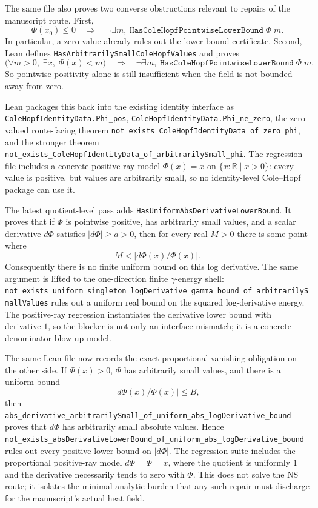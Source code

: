 \documentclass[11pt]{article}
\theoremstyle{remark}
\begin{document}
The same file also proves two converse obstructions relevant to repairs of the
manuscript route.  First,
\[
  \Phi(x_0) \le 0
  \quad\Longrightarrow\quad
  \neg \exists m,\; \texttt{HasColeHopfPointwiseLowerBound}\;\Phi\;m.
\]
In particular, a zero value already rules out the lower-bound certificate.
Second, Lean defines \texttt{HasArbitrarilySmallColeHopfValues} and proves
\[
  \bigl(\forall m>0,\; \exists x,\; \Phi(x)<m\bigr)
  \quad\Longrightarrow\quad
  \neg \exists m,\; \texttt{HasColeHopfPointwiseLowerBound}\;\Phi\;m.
\]
So pointwise positivity alone is still insufficient when the field is not
bounded away from zero.

Lean packages this back into the existing identity interface as
\texttt{ColeHopfIdentityData.Phi\_pos},
\texttt{ColeHopfIdentityData.Phi\_ne\_zero}, the zero-valued route-facing
theorem \texttt{not\_exists\_ColeHopfIdentityData\_of\_zero\_phi}, and the
stronger theorem \texttt{not\_exists\_ColeHopfIdentityData\_of\_arbitrarilySmall\_phi}.
The regression file includes a concrete positive-ray model
\(\Phi(x)=x\) on \(\{x:\mathbb{R}\mid x>0\}\): every value is positive, but
values are arbitrarily small, so no identity-level Cole--Hopf package can use
it.

The latest quotient-level pass adds
\texttt{HasUniformAbsDerivativeLowerBound}.  It proves that if \(\Phi\) is
pointwise positive, has arbitrarily small values, and a scalar derivative
\(d\Phi\) satisfies \(|d\Phi|\ge a>0\), then for every real \(M>0\) there is
some point where
\[
  M < |d\Phi(x)/\Phi(x)|.
\]
Consequently there is no finite uniform bound on this log derivative.  The same
argument is lifted to the one-direction finite \(\gamma\)-energy shell:
\texttt{not\_exists\_uniform\_singleton\_logDerivative\_gamma\_bound\_of\_arbitrarilySmallValues}
rules out a uniform real bound on the squared log-derivative energy.  The
positive-ray regression instantiates the derivative lower bound with derivative
\(1\), so the blocker is not only an interface mismatch; it is a concrete
denominator blow-up model.

The same Lean file now records the exact proportional-vanishing obligation on
the other side.  If \(\Phi(x)>0\), \(\Phi\) has arbitrarily small values, and
there is a uniform bound
\[
  |d\Phi(x)/\Phi(x)| \le B,
\]
then \texttt{abs\_derivative\_arbitrarilySmall\_of\_uniform\_abs\_logDerivative\_bound}
proves that \(d\Phi\) has arbitrarily small absolute values.  Hence
\texttt{not\_exists\_absDerivativeLowerBound\_of\_uniform\_abs\_logDerivative\_bound}
rules out every positive lower bound on \(|d\Phi|\).  The regression suite
includes the proportional positive-ray model \(d\Phi=\Phi=x\), where the
quotient is uniformly \(1\) and the derivative necessarily tends to zero with
\(\Phi\).  This does not solve the NS route; it isolates the minimal analytic
burden that any such repair must discharge for the manuscript's actual heat
field.
\end{document}
